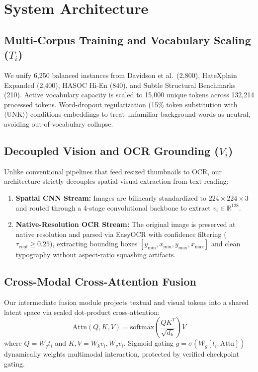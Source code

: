 \documentclass[11pt]{article}
\begin{document}
\section{System Architecture}

\subsection{Multi-Corpus Training and Vocabulary Scaling ($T_i$)}
We unify 6,250 balanced instances from Davidson et al.\ (2,800), HateXplain Expanded (2,400), HASOC Hi-En (840), and Subtle Structural Benchmarks (210). Active vocabulary capacity is scaled to 15,000 unique tokens across 132,214 processed tokens. Word-dropout regularization (15\% token substitution with $\langle\text{UNK}\rangle$) conditions embeddings to treat unfamiliar background words as neutral, avoiding out-of-vocabulary collapse.

\subsection{Decoupled Vision and OCR Grounding ($V_i$)}
Unlike conventional pipelines that feed resized thumbnails to OCR, our architecture strictly decouples spatial visual extraction from text reading:
\begin{enumerate}
    \item \textbf{Spatial CNN Stream:} Images are bilinearly standardized to $224 \times 224 \times 3$ and routed through a 4-stage convolutional backbone to extract $v_i \in \mathbb{R}^{128}$.
    \item \textbf{Native-Resolution OCR Stream:} The original image is preserved at native resolution and parsed via EasyOCR with confidence filtering ($\tau_{\text{conf}} \ge 0.25$), extracting bounding boxes $[y_{\min}, x_{\min}, y_{\max}, x_{\max}]$ and clean typography without aspect-ratio squashing artifacts.
\end{enumerate}

\subsection{Cross-Modal Cross-Attention Fusion}
Our intermediate fusion module projects textual and visual tokens into a shared latent space via scaled dot-product cross-attention:
\begin{equation}
    \text{Attn}(Q, K, V) = \text{softmax}\left(\frac{Q K^T}{\sqrt{d_k}}\right) V
\end{equation}
where $Q = W_q t_i$ and $K, V = W_k v_i, W_v v_i$. Sigmoid gating $g = \sigma(W_g [t_i; \text{Attn}])$ dynamically weights multimodal interaction, protected by verified checkpoint gating.
\end{document}
